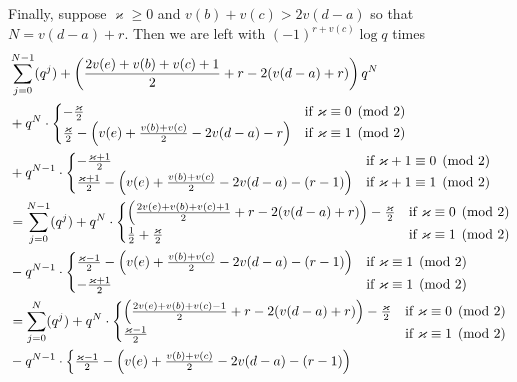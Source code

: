 \begin{itemize}
\ii Finally, suppose $\varkappa \ge 0$ and $v(b) + v(c) > 2v(d-a)$
so that $N = v(d-a) + r$.
Then we are left with $(-1)^{r+v(c)} \log q$ times
\begin{align*}
  & \sum_{j=0}^{N-1} (q^j) + \left( \frac{2v(e)+v(b)+v(c)+1}{2} + r - 2(v(d-a)+r) \right) q^N \\
  & + q^{N} \cdot
  \begin{cases}
    -\frac{\varkappa}{2} & \text{if }\varkappa \equiv 0 \pmod 2 \\
    \frac{\varkappa}{2} - \left( v(e)+\frac{v(b)+v(c)}{2}-2v(d-a)-r \right)
    & \text{if }\varkappa \equiv 1 \pmod 2 \\
  \end{cases} \\
  & + q^{N-1} \cdot
  \begin{cases}
    -\frac{\varkappa+1}{2} & \text{if }\varkappa+1 \equiv 0 \pmod 2 \\
    \frac{\varkappa+1}{2} - \left( v(e)+\frac{v(b)+v(c)}{2}-2v(d-a)-(r-1) \right)
    & \text{if }\varkappa+1 \equiv 1 \pmod 2
  \end{cases} \\
  &= \sum_{j=0}^{N-1} (q^j)
   + q^{N} \cdot
  \begin{cases}
    \left( \frac{2v(e)+v(b)+v(c)+1}{2} + r - 2(v(d-a)+r) \right) -\frac{\varkappa}{2} & \text{if }\varkappa \equiv 0 \pmod 2 \\
    \frac{1}{2} + \frac{\varkappa}{2} & \text{if }\varkappa \equiv 1 \pmod 2
  \end{cases} \\
  & - q^{N-1} \cdot
  \begin{cases}
    \frac{\varkappa-1}{2} - \left( v(e)+\frac{v(b)+v(c)}{2}-2v(d-a)-(r-1) \right)
    & \text{if }\varkappa \equiv 1 \pmod 2 \\
    -\frac{\varkappa+1}{2} & \text{if }\varkappa \equiv 1 \pmod 2
  \end{cases} \\
  &= \sum_{j=0}^{N} (q^j)
   + q^{N} \cdot
  \begin{cases}
    \left( \frac{2v(e)+v(b)+v(c)-1}{2} + r - 2(v(d-a)+r) \right) -\frac{\varkappa}{2} & \text{if }\varkappa \equiv 0 \pmod 2 \\
    \frac{\varkappa-1}{2} & \text{if }\varkappa \equiv 1 \pmod 2
  \end{cases} \\
  & - q^{N-1} \cdot
  \begin{cases}
    \frac{\varkappa-1}{2} - \left( v(e)+\frac{v(b)+v(c)}{2}-2v(d-a)-(r-1) \right)

\end{cases}
\end{align*}
\end{itemize}
